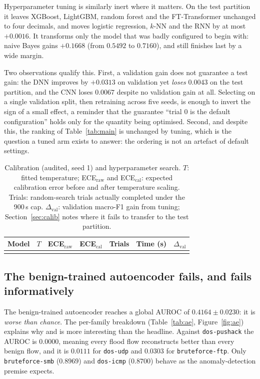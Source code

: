 \documentclass[review,12pt]{elsarticle}
\begin{document}
Hyperparameter tuning is similarly inert where it matters. On the test partition it
leaves XGBoost, LightGBM, random forest and the FT-Transformer unchanged to four decimals,
and moves logistic regression, $k$-NN and the RNN by at most $+0.0016$. It transforms only
the model that was badly configured to begin with: naive Bayes gains $+0.1668$
(from $0.5492$ to $0.7160$), and still finishes last by a wide margin.

Two observations qualify this. First, a validation gain does not guarantee a test gain:
the DNN improves by $+0.0313$ on validation yet \emph{loses} $0.0043$ on the test
partition, and the CNN loses $0.0067$ despite no validation gain at all. Selecting on a
single validation split, then retraining across five seeds, is enough to invert the sign
of a small effect, a reminder that the guarantee ``trial 0 is the default
configuration'' holds only for the quantity being optimised. Second, and despite this, the
ranking of Table~\ref{tab:main} is unchanged by tuning, which is the question a tuned arm
exists to answer: the ordering is not an artefact of default settings.

\begin{table}[t]
\centering
\caption{Calibration (audited, seed 1) and hyperparameter search. $T$: fitted temperature;
ECE$_{\mathrm{raw}}$ and ECE$_{\mathrm{cal}}$: expected calibration error before and after
temperature scaling. Trials: random-search trials actually completed under the 900\,s cap.
$\Delta_{\mathrm{val}}$: validation macro-F1 gain from tuning; Section~\ref{sec:calib}
notes where it fails to transfer to the test partition.}
\label{tab:calib}
\footnotesize
\setlength{\tabcolsep}{5pt}
\begin{tabular}{lccccrr}
\toprule
Model & $T$ & ECE$_{\mathrm{raw}}$ & ECE$_{\mathrm{cal}}$ & Trials & Time (s) & $\Delta_{\mathrm{val}}$\\
\midrule
\\
\bottomrule
\end{tabular}
\end{table}

\subsection{The benign-trained autoencoder fails, and fails informatively}
\label{sec:autoencoder}
The benign-trained autoencoder reaches a global AUROC of $0.4164 \pm 0.0230$: it is
\emph{worse than chance}. The per-family breakdown (Table~\ref{tab:ae},
Figure~\ref{fig:ae}) explains why and is more interesting than the headline. Against
\texttt{dos-pushack} the AUROC is $0.0000$, meaning every flood flow reconstructs better
than every benign flow, and it is $0.0111$ for \texttt{dos-udp} and $0.0303$ for
\texttt{bruteforce-ftp}. Only \texttt{bruteforce-smb} ($0.8969$) and
\texttt{dos-icmp} ($0.8700$) behave as the anomaly-detection premise expects.
\end{document}
